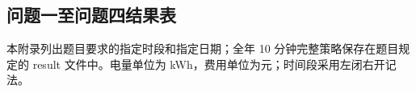 \documentclass[withoutpreface,bwprint]{cumcmthesis} %
\begin{document}
\begin{appendices}



\begingroup
\small
\setlength{\tabcolsep}{3.5pt}
\renewcommand{\arraystretch}{1.08}
\setlength{\LTpre}{2pt}
\setlength{\LTpost}{4pt}
\setlength{\abovecaptionskip}{3pt}
\setlength{\belowcaptionskip}{2pt}

\section{问题一至问题四结果表}
\noindent 本附录列出题目要求的指定时段和指定日期；全年 10 分钟完整策略保存在题目规定的 result 文件中。电量单位为 kWh，费用单位为元；时间段采用左闭右开记法。

\end{appendices}
\end{document}
